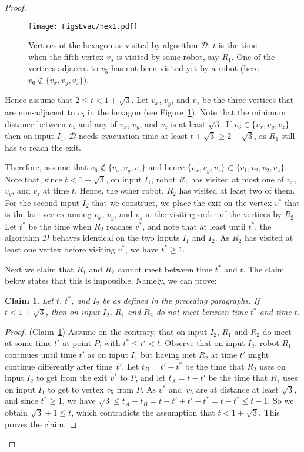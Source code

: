 \documentclass[
final
]{dmtcs-episciences}
\newcommand{\RA}{\ensuremath{R_1}}
\newcommand{\RB}{\ensuremath{R_2 }}
\newtheorem{claim}[theorem]{Claim}
\theoremstyle{definition}
\begin{document}
\begin{proof}
\begin{figure}[ht]
                \centering
                \texttt{[image: FigsEvac/hex1.pdf]}
                \caption{Vertices of the hexagon as visited by algorithm $\mathcal D$; $t$ is the time when the fifth vertex $v_5$ is visited by some robot, say $\RA$. One of the vertices adjacent to $v_5$ has not been visited yet by a robot (here $v_6 \not\in \{v_x,v_y,v_z\}$).}
                \label{fig: hex}
\end{figure}
Hence assume that $2 \leq t < 1 + \sqrt{3}$. Let $v_x$, $v_y$, and $v_z$ be the three vertices that are non-adjacent to $v_5$ in the hexagon (see Figure~\ref{fig: hex}).
Note that the minimum distance between $v_5$ and any of $v_x$, $v_y$, and $v_z$ is at least $\sqrt{3}$.
If $v_6 \in \{v_x,v_y,v_z\}$ then on input $I_1$, $\mathcal D$ needs evacuation time at least $t+\sqrt{3} \geq 2+\sqrt{3}$, as $\RA$ still has to 
reach the exit. 

Therefore, assume that $v_6 \not\in \{v_x,v_y,v_z\}$ and hence 	$\{v_x,v_y,v_z\} \subset \{v_1,v_2,v_2,v_4\}$.
Note that, since $t < 1+ \sqrt{3}$, on input $I_1$, robot
$\RA$ has visited at most one of $v_x$, $v_y$, and $v_z$ at time $t$. 
Hence, the other robot, $\RB$ has visited at least two of them.
For the second input $I_2$ that we construct, we place the exit on the vertex $v^*$ that is the last vertex among $v_x$, $v_y$, and $v_z$ in the visiting order of the vertices by $\RB$.
Let $t^*$ be the time when $\RB$ reaches $v^*$, and note that at least until $t^*$, the algorithm $\mathcal D$ behaves identical on the two inputs $I_1$ and $I_2$.
As $\RB$ has visited at least one vertex before visiting $v^*$, we have $t^* \geq 1$.

Next we claim that $\RA$ and $\RB$ cannot meet between time $t^*$ and $t$.
The claim below states that this is impossible. Namely, we can prove:
\begin{claim}\label{claim:hex}
Let $t$, $t^*$, and $I_2$ be as defined in the preceding paragraphs. 
If $t < 1+ \sqrt{3}$, then on input $I_2$, $\RA$ and $\RB$ do not meet between time $t^*$ and time $t$.
\end{claim}
\begin{proof} (Claim~\ref{claim:hex})
Assume on the contrary, that
on input $I_2$, $\RA$ and $\RB$ do meet at some time $t'$ at point $P$, with
$t^* \leq t' < t$.
Observe that on input $I_2$, robot $\RA$ continues until time $t'$ as on input $I_1$ but having met $\RB$ at time $t'$ might continue differently after time~$t'$.
Let $t_B=t'-t^*$ be the time that $\RB$ uses on input $I_2$ to get from the exit $v^*$ to $P$,  
and let $t_A = t-t'$ be the time that $\RA$ uses on input $I_1$ to get to vertex $v_5$ from $P$.  As $v^*$ and~$v_5$ are at distance at least $\sqrt{3}$, and since $t^* \geq 1$, we have
$\sqrt{3} \leq t_A + t_B = t-t' + t'-t^* = t-t^* \leq t-1$.  So we obtain $\sqrt{3}+1 \leq t$, which contradicts the assumption that $t < 1+\sqrt{3}$.
This proves the claim. 
\end{proof}



\end{proof}
\end{document}
